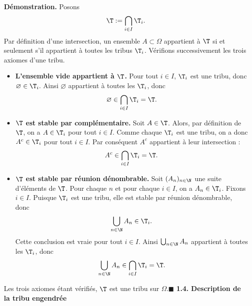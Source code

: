 \textbf{Démonstration.} Posons
\[\T:=\bigcap_{i\in I}\T_i.\]
Par définition d’une intersection, un ensemble $A\subset\Omega$ appartient à $\T$ si et seulement s’il appartient à toutes les tribus $\T_i$. Vérifions successivement les trois axiomes d’une tribu.
\begin{itemize}
\item \textbf{L’ensemble vide appartient à $\T$.} Pour tout $i\in I$, $\T_i$ est une tribu, donc $\varnothing\in\T_i$. Ainsi $\varnothing$ appartient à toutes les $\T_i$, donc
\[\varnothing\in\bigcap_{i\in I}\T_i=\T.\]
\item \textbf{$\T$ est stable par complémentaire.} Soit $A\in\T$. Alors, par définition de $\T$, on a $A\in\T_i$ pour tout $i\in I$. Comme chaque $\T_i$ est une tribu, on a donc $A^c\in\T_i$ pour tout $i\in I$. Par conséquent $A^c$ appartient à leur intersection :
\[A^c\in\bigcap_{i\in I}\T_i=\T.\]
\item \textbf{$\T$ est stable par réunion dénombrable.} Soit $(A_n)_{n\in\N}$ une suite d’éléments de $\T$. Pour chaque $n$ et pour chaque $i\in I$, on a $A_n\in\T_i$. Fixons $i\in I$. Puisque $\T_i$ est une tribu, elle est stable par réunion dénombrable, donc
\[\bigcup_{n\in\N}A_n\in\T_i.\]
Cette conclusion est vraie pour tout $i\in I$. Ainsi $\bigcup_{n\in\N}A_n$ appartient à toutes les $\T_i$, donc
\[\bigcup_{n\in\N}A_n\in\bigcap_{i\in I}\T_i=\T.\]
\end{itemize}
Les trois axiomes étant vérifiés, $\T$ est une tribu sur $\Omega$.\hfill$\blacksquare$
\textbf{1.4. Description de la tribu engendrée}


